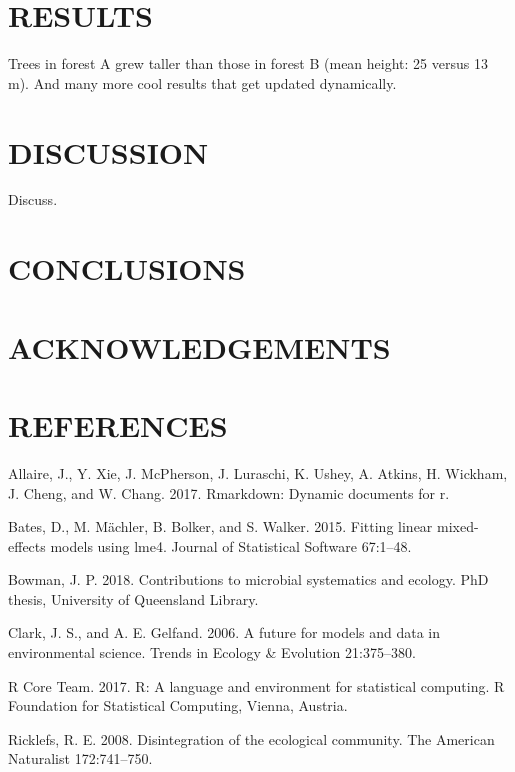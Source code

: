 \documentclass[11pt,a4paper]{article}
\begin{document}
\section{RESULTS}\label{results}

Trees in forest A grew taller than those in forest B (mean height: 25
versus 13 m). And many more cool results that get updated dynamically.

\section{DISCUSSION}\label{discussion}

Discuss.

\section{CONCLUSIONS}\label{conclusions}

\section{ACKNOWLEDGEMENTS}\label{acknowledgements}

\section{REFERENCES}\label{references}

\hypertarget{refs}{}
\hypertarget{ref-Allaire_2017}{}
Allaire, J., Y. Xie, J. McPherson, J. Luraschi, K. Ushey, A. Atkins, H.
Wickham, J. Cheng, and W. Chang. 2017. Rmarkdown: Dynamic documents for
r.

\hypertarget{ref-Bates_2015}{}
Bates, D., M. Mächler, B. Bolker, and S. Walker. 2015. Fitting linear
mixed-effects models using lme4. Journal of Statistical Software
67:1--48.

\hypertarget{ref-Bowman}{}
Bowman, J. P. 2018. Contributions to microbial systematics and ecology.
PhD thesis, University of Queensland Library.

\hypertarget{ref-Clark_2006}{}
Clark, J. S., and A. E. Gelfand. 2006. A future for models and data in
environmental science. Trends in Ecology \& Evolution 21:375--380.

\hypertarget{ref-R_Core_Team_2017}{}
R Core Team. 2017. R: A language and environment for statistical
computing. R Foundation for Statistical Computing, Vienna, Austria.

\hypertarget{ref-Ricklefs_2008}{}
Ricklefs, R. E. 2008. Disintegration of the ecological community. The
American Naturalist 172:741--750.
\end{document}
